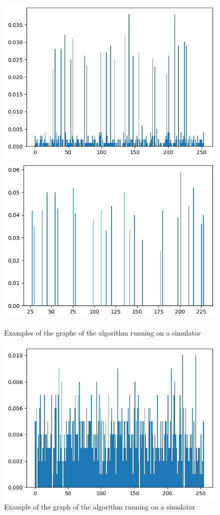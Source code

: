 \documentclass[10pt,a4paper]{article}
\begin{document}
\begin{figure}[hbtp]
\centering
\includegraphics[scale=0.5]{results/example_2_1_iteration.png}
\includegraphics[scale=0.5]{results/example_2_2_iterations.png}
\caption{Examples of the graphs of the algorithm running on a simulator}
\end{figure}

\begin{figure}[hbtp]
\centering
\includegraphics[scale=0.5]{results/example_3.png}
\caption {Example of the graph of the algorithm running on a simulator}
\end{figure}
\end{document}
